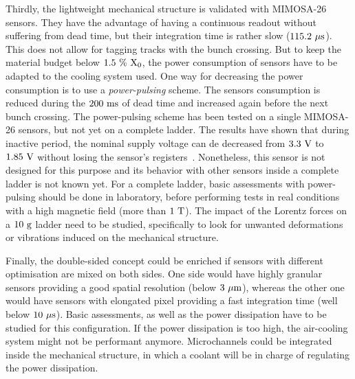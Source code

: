 Thirdly, the lightweight mechanical structure is validated with \gls{MIMOSA}-26 sensors.
They have the advantage of having a continuous readout without suffering from dead time, but their integration time is rather slow ($115.2~\rm{\mu s}$).
This does not allow for tagging tracks with the bunch crossing.
But to keep the material budget below $1.5~\%~\rm{X_{0}}$, the power consumption of sensors have to be adapted to the cooling system used.
One way for decreasing the power consumption is to use a \textit{power-pulsing} scheme.
The sensors consumption is reduced during the $200~\rm{ms}$ of dead time and increased again before the next bunch crossing.
The power-pulsing scheme has been tested on a single \gls{MIMOSA}-26 sensors, but not yet on a complete ladder.
The results have shown that during inactive period, the nominal supply voltage can de decreased from $3.3~\rm{V}$ to $1.85~\rm{V}$ without losing the sensor's registers~\cite{Kuprash2013}.
Nonetheless, this sensor is not designed for this purpose and its behavior with other sensors inside a complete ladder is not known yet.
For a complete ladder, basic assessments with power-pulsing should be done in laboratory, before performing tests in real conditions with a high magnetic field (more than $1~\rm{T}$).
The impact of the Lorentz forces on a $10~\rm{g}$ ladder need to be studied, specifically to look for unwanted deformations or vibrations induced on the mechanical structure.

Finally, the double-sided concept could be enriched if sensors with different optimisation are mixed on both sides.
One side would have highly granular sensors providing a good spatial resolution (below $3~\rm{\mu m}$), whereas the other one would have sensors with elongated pixel providing a fast integration time (well below $10~\rm{\mu s}$).
Basic assessments, as well as the power dissipation have to be studied for this configuration.
If the power dissipation is too high, the air-cooling system might not be performant anymore.
Microchannels could be integrated inside the mechanical structure, in which a coolant will be in charge of regulating the power dissipation.


